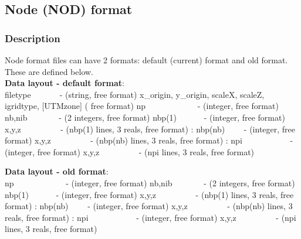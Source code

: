 \documentclass{article}
\begin{document}
\newpage
\subsection[Node (NOD) format]{Node (NOD) format}

\subsubsection[Description]{Description}

Node format files can have 2 formats: default (current) format and old format.
These are defined below.\\

\textbf{Data layout - default format}: \\ 

\noindent
filetype\ \ \ \ \ \ \ {}- (string, free format) \newline
x\_origin, y\_origin, scaleX, scaleZ, igridtype,  [UTMzone] ( free format)\newline
np \ \ \ \ \ \ \ \ \ \ \ \ {}- (integer, free format)\newline
nb,nib \ \ \ \ \ \ \ {}- (2 integers, free format)\newline
nbp(1) \ \ \ \ \ \ {}- (integer, free format)\newline
x,y,z \ \ \ \ \ \ \ \ \ {}- (nbp(1) lines, 3 reals, free format)\newline
:\newline
nbp(nb) \ \ \ \ {}- (integer, free format)\newline
x,y,z \ \ \ \ \ \ \ \ \ {}- (nbp(nb) lines, 3 reals, free format)\newline
:\newline
npi \ \ \ \ \ \ \ \ \ \ \ {}- (integer, free format)\newline
x,y,z \ \ \ \ \ \ \ \ \ {}- (npi lines, 3 reals, free format)\newline

\textbf{Data layout - old format}: \\ 

\noindent
np \ \ \ \ \ \ \ \ \ \ \ \ {}- (integer, free format)\newline
nb,nib \ \ \ \ \ \ \ {}- (2 integers, free format)\newline
nbp(1) \ \ \ \ \ \ {}- (integer, free format)\newline
x,y,z \ \ \ \ \ \ \ \ \ {}- (nbp(1) lines, 3 reals, free format)\newline
:\newline
nbp(nb) \ \ \ \ {}- (integer, free format)\newline
x,y,z \ \ \ \ \ \ \ \ \ {}- (nbp(nb) lines, 3 reals, free format)\newline
:\newline
npi \ \ \ \ \ \ \ \ \ \ \ {}- (integer, free format)\newline
x,y,z \ \ \ \ \ \ \ \ \ {}- (npi lines, 3 reals, free format)\newline
\end{document}
